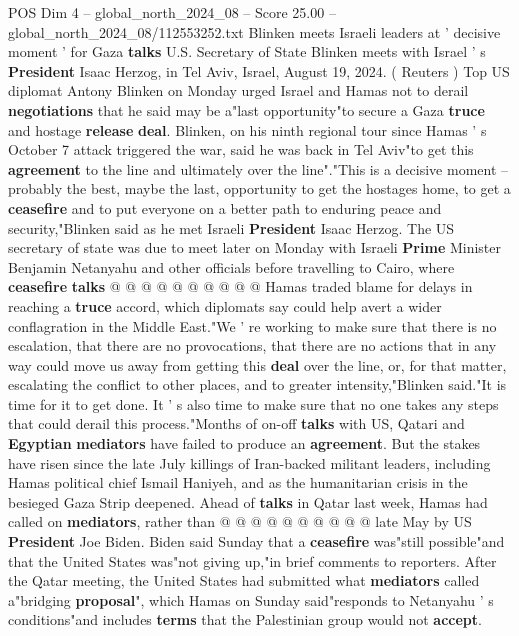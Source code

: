 \begin{textsample}{POS Dim 4 – global\_north\_2024\_08 – Score 25.00 – global\_north\_2024\_08/112553252.txt}  \label{ex:f4_pos_154}
Blinken meets Israeli leaders at ' decisive moment ' for Gaza \textbf{talks} U.S.
Secretary of State Blinken meets with Israel ' s \textbf{President} Isaac Herzog, in Tel Aviv, Israel, August 19, 2024. ( Reuters ) Top US diplomat Antony Blinken on Monday urged Israel and Hamas not to derail \textbf{negotiations} that he said may be a"last opportunity"to secure a Gaza \textbf{truce} and hostage \textbf{release} \textbf{deal}.
Blinken, on his ninth regional tour since Hamas ' s October 7 attack triggered the war, said he was back in Tel Aviv"to get this \textbf{agreement} to the line and ultimately over the line"."This is a decisive moment -- probably the best, maybe the last, opportunity to get the hostages home, to get a \textbf{ceasefire} and to put everyone on a better path to enduring peace and security,"Blinken said as he met Israeli \textbf{President} Isaac Herzog.
The US secretary of state was due to meet later on Monday with Israeli \textbf{Prime} Minister Benjamin Netanyahu and other officials before travelling to Cairo, where \textbf{ceasefire} \textbf{talks} @ @ @ @ @ @ @ @ @ @ Hamas traded blame for delays in reaching a \textbf{truce} accord, which diplomats say could help avert a wider conflagration in the Middle East."We ' re working to make sure that there is no escalation, that there are no provocations, that there are no actions that in any way could move us away from getting this \textbf{deal} over the line, or, for that matter, escalating the conflict to other places, and to greater intensity,"Blinken said."It is time for it to get done.
It ' s also time to make sure that no one takes any steps that could derail this process."Months of on-off \textbf{talks} with US, Qatari and \textbf{Egyptian} \textbf{mediators} have failed to produce an \textbf{agreement}.
But the stakes have risen since the late July killings of Iran-backed militant leaders, including Hamas political chief Ismail Haniyeh, and as the humanitarian crisis in the besieged Gaza Strip deepened.
Ahead of \textbf{talks} in Qatar last week, Hamas had called on \textbf{mediators}, rather than @ @ @ @ @ @ @ @ @ @ late May by US \textbf{President} Joe Biden.
Biden said Sunday that a \textbf{ceasefire} was"still possible"and that the United States was"not giving up,"in brief comments to reporters.
After the Qatar meeting, the United States had submitted what \textbf{mediators} called a"bridging \textbf{proposal}", which Hamas on Sunday said"responds to Netanyahu ' s conditions"and includes \textbf{terms} that the Palestinian group would not \textbf{accept}.

\end{textsample}
